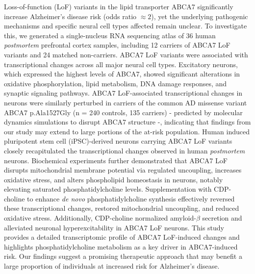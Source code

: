 Loss-of-function (LoF) variants in the lipid transporter ABCA7 significantly increase Alzheimer's disease risk (odds ratio $\approx  2$), yet the underlying pathogenic mechanisms and specific neural cell types affected remain unclear. To investigate this, we generated a single-nucleus RNA sequencing atlas of 36 human \textit{postmortem} prefrontal cortex samples, including 12 carriers of ABCA7 LoF variants and 24 matched non-carriers. ABCA7 LoF variants were associated with transcriptional changes across all major neural cell types. Excitatory neurons, which expressed the highest levels of ABCA7, showed significant alterations in oxidative phosphorylation, lipid metabolism, DNA damage responses, and synaptic signaling pathways. ABCA7 LoF-associated transcriptional changes in neurons were similarly perturbed in carriers of the common AD missense variant ABCA7 p.Ala1527Gly (n = 240 controls, 135 carriers) - predicted by molecular dynamics simulations to disrupt ABCA7 structure -, indicating that findings from our study may extend to large portions of the at-risk population. Human induced pluripotent stem cell (iPSC)-derived neurons carrying ABCA7 LoF variants closely recapitulated the transcriptional changes observed in human \textit{postmortem} neurons. Biochemical experiments further demonstrated that ABCA7 LoF disrupts mitochondrial membrane potential via regulated uncoupling, increases oxidative stress, and alters phospholipid homeostasis in neurons, notably elevating saturated phosphatidylcholine levels. Supplementation with CDP-choline to enhance \textit{de novo} phosphatidylcholine synthesis effectively reversed these transcriptional changes, restored mitochondrial uncoupling, and reduced oxidative stress. Additionally, CDP-choline normalized amyloid-$\beta$ secretion and alleviated neuronal hyperexcitability in ABCA7 LoF neurons. This study provides a detailed transcriptomic profile of ABCA7 LoF-induced changes and highlights phosphatidylcholine metabolism as a key driver in ABCA7-induced risk. Our findings suggest a promising therapeutic approach that may benefit a large proportion of individuals at increased risk for Alzheimer's disease.

